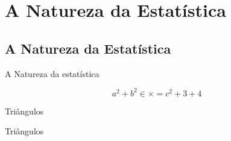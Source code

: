 \documentclass[professor,nofonts]{livroabertoem}
\author{Tarso Boudet Caldas \and Tarso Caldas}
\begin{document}
\tableofcontents


\chapter{A Natureza da Estatística}


\begin{teacherintroduction}
	\lipsum[2]

	\begin{habilities}
	\end{habilities}

	\begin{habilities}
		\efhability{01}{04}
	\end{habilities}

	\lipsum[3-15]

\end{teacherintroduction}

\section{A Natureza da Estatística}

\begin{longteachersection}{A Natureza da estatística}
	\lipsum[3-15]
\end{longteachersection}


\lipsum[1]
\[
	a^2 + b^2 \in \times = c^2 + 3 + 4
\]

\begin{task}{Triângulos}
	\begin{teacher}
		\lipsum[12]
		\lipsum[13]
		\lipsum[13]
	\end{teacher}

	\lipsum[2]
\end{task}

\lipsum[3]


\begin{example}{Triângulos}
	\lipsum[4]
\end{example}

\newpage

\begin{knowledge}
	\lipsum[6]
\end{knowledge}
\end{document}

